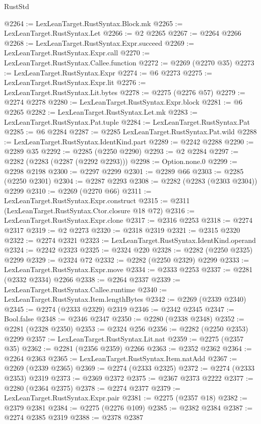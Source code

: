 \begin{lexlean}{RustStd}
\begin{coremodule}
@2264 := LexLeanTarget.RustSyntax.Block.mk
@2265 := LexLeanTarget.RustSyntax.Let
@2266 := @2 @2265
@2267 := @2264 @2266
@2268 := LexLeanTarget.RustSyntax.Expr.succeed
@2269 := LexLeanTarget.RustSyntax.Expr.call
@2270 := LexLeanTarget.RustSyntax.Callee.function
@2272 := @2269 (@2270 @35)
@2273 := LexLeanTarget.RustSyntax.Expr
@2274 := @6 @2273
@2275 := LexLeanTarget.RustSyntax.Expr.lit
@2276 := LexLeanTarget.RustSyntax.Lit.bytes
@2278 := @2275 (@2276 @57)
@2279 := @2274 @2278
@2280 := LexLeanTarget.RustSyntax.Expr.block
@2281 := @6 @2265
@2282 := LexLeanTarget.RustSyntax.Let.mk
@2283 := LexLeanTarget.RustSyntax.Pat.tuple
@2284 := LexLeanTarget.RustSyntax.Pat
@2285 := @6 @2284
@2287 := @2285 LexLeanTarget.RustSyntax.Pat.wild
@2288 := LexLeanTarget.RustSyntax.IdentKind.part
@2289 := @2242 @2288
@2290 := @2289 @35
@2292 := @2285 (@2250 @2290)
@2293 := @2 @2284
@2297 := @2282 (@2283 (@2287 (@2292 @2293)))
@2298 := Option.none.{0}
@2299 := @2298 @2198
@2300 := @2297 @2299
@2301 := @2289 @66
@2303 := @2285 (@2250 @2301)
@2304 := @2287 @2293
@2308 := @2282 (@2283 (@2303 @2304)) @2299
@2310 := @2269 (@2270 @66)
@2311 := LexLeanTarget.RustSyntax.Expr.construct
@2315 := @2311 (LexLeanTarget.RustSyntax.Ctor.closure @18 @72)
@2316 := LexLeanTarget.RustSyntax.Expr.clone
@2317 := @2316 @2253
@2318 := @2274 @2317
@2319 := @2 @2273
@2320 := @2318 @2319
@2321 := @2315 @2320
@2322 := @2274 @2321
@2323 := LexLeanTarget.RustSyntax.IdentKind.operand
@2324 := @2242 @2323
@2325 := @2324 @220
@2328 := @2282 (@2250 @2325) @2299
@2329 := @2324 @72
@2332 := @2282 (@2250 @2329) @2299
@2333 := LexLeanTarget.RustSyntax.Expr.move
@2334 := @2333 @2253
@2337 := @2281 (@2332 @2334) @2266
@2338 := @2264 @2337
@2339 := LexLeanTarget.RustSyntax.Callee.runtime
@2340 := LexLeanTarget.RustSyntax.Item.lengthBytes
@2342 := @2269 (@2339 @2340)
@2345 := @2274 (@2333 @2329) @2319
@2346 := @2342 @2345
@2347 := Bool.false
@2348 := @2346 @2347
@2350 := @2280 (@2338 @2348)
@2352 := @2281 (@2328 @2350)
@2353 := @2324 @256
@2356 := @2282 (@2250 @2353) @2299
@2357 := LexLeanTarget.RustSyntax.Lit.nat
@2359 := @2275 (@2357 @35)
@2362 := @2281 (@2356 @2359) @2266
@2363 := @2352 @2362
@2364 := @2264 @2363
@2365 := LexLeanTarget.RustSyntax.Item.natAdd
@2367 := @2269 (@2339 @2365)
@2369 := @2274 (@2333 @2325)
@2372 := @2274 (@2333 @2353) @2319
@2373 := @2369 @2372
@2375 := @2367 @2373 @2222
@2377 := @2280 (@2364 @2375)
@2378 := @2274 @2377
@2379 := LexLeanTarget.RustSyntax.Expr.pair
@2381 := @2275 (@2357 @18)
@2382 := @2379 @2381
@2384 := @2275 (@2276 @109)
@2385 := @2382 @2384
@2387 := @2274 @2385 @2319
@2388 := @2378 @2387

\end{coremodule}
\end{lexlean}
